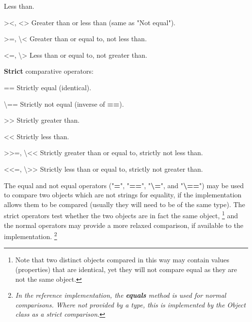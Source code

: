 \begin{description}
\begin{description}
Less than.
\item{><, <>}
Greater than or less than (same as "Not equal").
\item{>=, \textbackslash <}
Greater than or equal to, not less than.
\item{<=, \textbackslash >}
Less than or equal to, not greater than.
\end{description}
\index{,}
\index{,}
\index{,}
\index{,}
\index{,}
\index{,}
\index{,}
\index{,}
 \textbf{Strict} comparative operators:
\begin{description}
\item{==}
Strictly equal (identical).
\item{\textbackslash ==}
Strictly not equal (inverse of \textbf{==}).
\item{>>}
Strictly greater than.
\item{<<}
Strictly less than.
\item{>>=, \textbackslash <<}
Strictly greater than or equal to, strictly not less than.
\item{<<=, \textbackslash >>}
Strictly less than or equal to, strictly not greater than.
\end{description}
 
The equal and not equal operators ("\textbf{=}",
"\textbf{==}", "\textbf{\textbackslash =}", and
"\textbf{\textbackslash ==}") may be used to compare two objects which
are not strings for equality, if the implementation allows them to be
compared (usually they will need to be of the same type).  The strict
operators test whether the two objects are in fact the same object,
\footnote{
Note that two distinct objects compared in this way may contain values
(properties) that are identical, yet they will not compare equal as they
are not the same object.
}
and the normal operators may provide a more relaxed comparison, if
available to the implementation.
\footnote{
\emph{In the reference implementation, the \textbf{equals} method is
used for normal comparisons.  Where not provided by a type, this is
implemented by the Object class as a strict comparison.}
}
 

\end{description}
